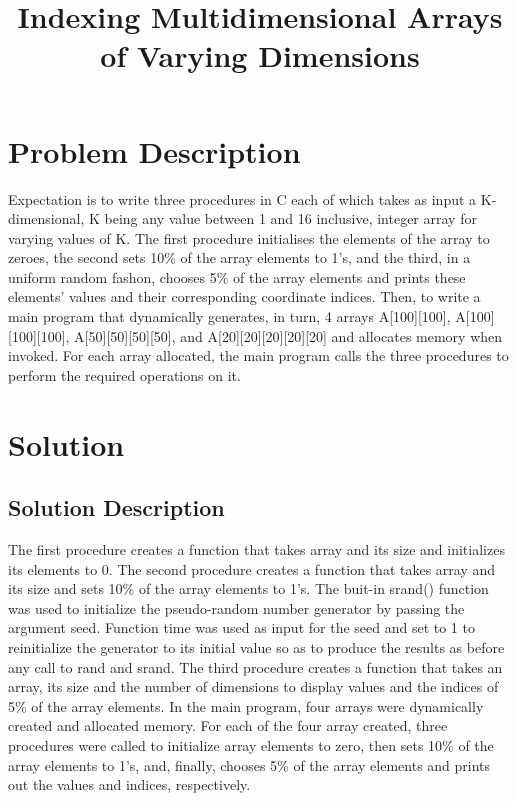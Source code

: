 \documentclass{article}
\begin{document}
\title{Indexing Multidimensional Arrays of Varying Dimensions}

\section{Problem Description}
Expectation is to write three procedures in C each of which takes as input a K-dimensional, K being any value between 1 and 16 inclusive, integer array for varying values of K. The first procedure initialises the elements of the array to zeroes, the second sets 10\% of the array elements to 1's, and the third, in a uniform random fashon, chooses 5\% of the array elements and prints these elements' values and their corresponding coordinate indices. Then, to write a main program that dynamically generates, in turn, 4 arrays A[100][100], A[100][100][100], A[50][50][50][50], and A[20][20][20][20][20] and allocates memory when invoked. For each array allocated, the main program calls the three procedures to perform the required operations on it.
\section{Solution}
\subsection{Solution Description}
The first procedure creates a function that takes array and its size and initializes its elements to 0.
The second procedure creates a function that takes array and its size and sets 10\% of the array elements to 1's. The buit-in srand() function was used to initialize the pseudo-random number generator by passing the argument seed. Function time was used as input for the seed and set to 1 to reinitialize the generator to its initial value so as to produce the results as before any call to rand and srand.
The third procedure creates a function that takes an array, its size and the number of dimensions to display values and the indices of 5\% of the array elements.
In the main program, four arrays were dynamically created and allocated memory. For each of the four array created, three procedures were called to initialize array elements to zero, then sets 10\% of the array elements to 1's, and, finally, chooses 5\% of the array elements and prints out the values and indices, respectively. 
\end{document}

